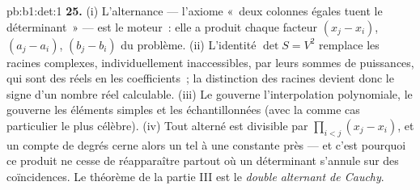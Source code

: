 \begin{solution}{pb:b1:det:1}
\textbf{25.} (i) L'alternance --- l'axiome «~deux colonnes égales
tuent le déterminant~» --- est le moteur~: elle a produit chaque
facteur $(x_j - x_i)$, $(a_j - a_i)$, $(b_j - b_i)$ du
problème. (ii) L'identité $\det S = V^2$ remplace les racines
complexes, individuellement inaccessibles, par leurs sommes de
puissances, qui sont des  réels en les coefficients~; la
distinction des racines devient donc le signe d'un nombre réel
calculable. (iii) Le  gouverne
l'interpolation polynomiale, le  gouverne les
éléments simples et les  échantillonnées (avec
la  comme cas particulier le plus célèbre). (iv)
Tout  alterné est divisible par $\prod_{i<j}(x_j - x_i)$, et un
compte de degrés cerne alors un tel  à une constante près ---
et c'est pourquoi ce produit ne cesse de réapparaître partout où un
déterminant s'annule sur des coïncidences. Le théorème de la partie
III est le \emph{double alternant de Cauchy}.
\end{solution}
